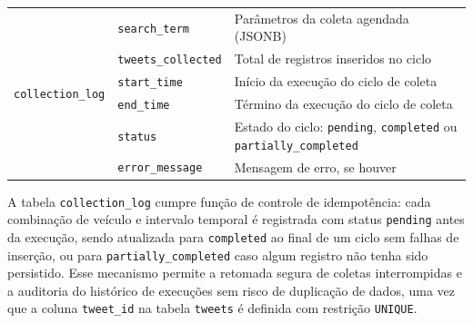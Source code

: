 \begin{quadro}[!htb]
\begin{tabular}{|p{4.5cm}|p{4.5cm}|p{5.8cm}|}
		\hline
		\multirow{6}{*}{\texttt{collection\_log}} & \texttt{search\_term} & Parâmetros da coleta agendada (JSONB) \\ & \texttt{tweets\_collected}    & Total de registros inseridos no 	ciclo \\
		& \texttt{start\_time} & Início da execução do ciclo de coleta \\ & \texttt{end\_time} & Término da execução do ciclo de coleta \\ 	& \texttt{status} & Estado do ciclo: \texttt{pending}, 		\texttt{completed} ou \texttt{partially\_completed} \\ & \texttt{error\_message} & Mensagem de erro, se houver \\
		\hline
	\end{tabular}
\end{quadro}

A tabela \texttt{collection\_log} cumpre função de controle de idempotência: cada combinação de veículo e intervalo temporal é registrada com status \texttt{pending} antes da execução, sendo
atualizada para \texttt{completed} ao final de um ciclo sem falhas de inserção, ou para \texttt{partially\_completed} caso algum registro não tenha sido persistido. Esse mecanismo permite a retomada segura de coletas interrompidas e a auditoria do histórico de execuções sem risco de duplicação de dados, uma vez que a coluna \texttt{tweet\_id} na tabela \texttt{tweets} é definida com restrição \texttt{UNIQUE}.
